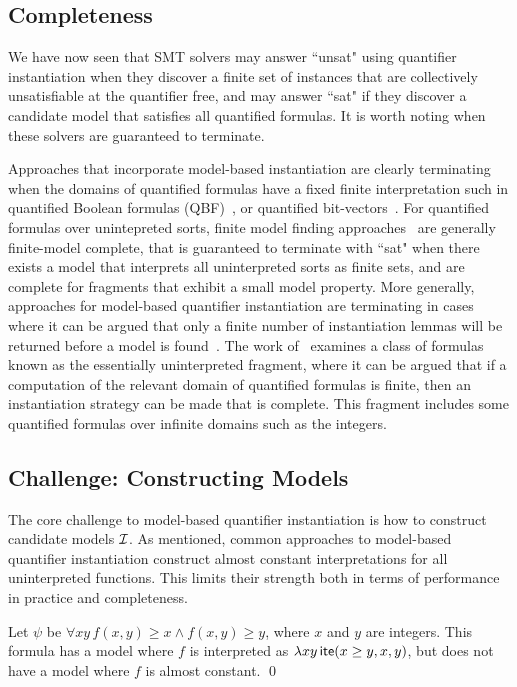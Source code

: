 \documentclass{easychair}
\begin{document}
\subsection{Completeness}
We have now seen that SMT solvers may answer ``unsat" using quantifier instantiation
when they discover a finite set of instances that are collectively unsatisfiable at the quantifier free,
and may answer ``sat" if they discover a candidate model that satisfies all quantified formulas.
It is worth noting when these solvers are guaranteed to terminate.

Approaches that incorporate model-based instantiation are clearly terminating
when the domains of quantified formulas have a fixed finite interpretation
such in quantified Boolean formulas (QBF)~\cite{janota2012solving},
or quantified bit-vectors~\cite{wintersteiger2013efficiently}.
For quantified formulas over unintepreted sorts,
finite model finding approaches~\cite{ReyEtAl-1-RR-13} are generally finite-model complete,
that is guaranteed to terminate with ``sat" when there exists a model that interprets
all uninterpreted sorts as finite sets, and are complete for fragments
that exhibit a small model property.
More generally, approaches for model-based quantifier instantiation are terminating in cases
where it can be argued that only a finite number of instantiation lemmas will be returned before 
a model is found~\cite{ihlemann2008local,GeDeM-CAV-09}.
The work of~\cite{GeDeM-CAV-09} examines a class of formulas known as the essentially uninterpreted fragment,
where it can be argued that if a computation of the relevant domain of quantified formulas is finite,
then an instantiation strategy can be made that is complete.
This fragment includes some quantified formulas over infinite domains such as the integers.

\subsection{Challenge: Constructing Models}
The core challenge to model-based quantifier instantiation is how to construct candidate models $\mathcal{I}$.
As mentioned, common approaches to model-based quantifier instantiation
construct almost constant interpretations for all uninterpreted functions.
This limits their strength both in terms of performance in practice and completeness.

\begin{example}
Let $\psi$ be $\forall xy\, f( x, y ) \geq x \wedge f( x, y ) \geq y$, where $x$ and $y$ are integers.
This formula has a model where $f$ is interpreted as $\lambda xy\, \mathsf{ite}( x \geq y, x, y )$,
but does not have a model where $f$ is almost constant.
\qed
\end{example}
\end{document}

